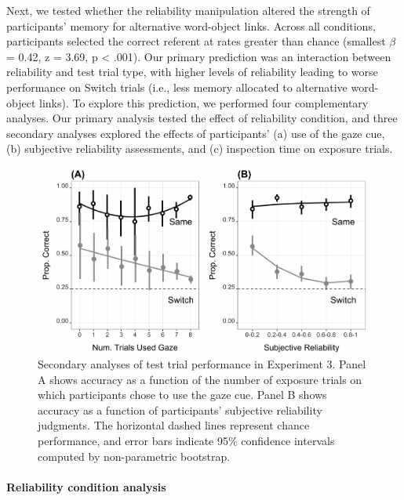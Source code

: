 \documentclass[authoryear, review]{elsarticle}
\newenvironment{CodeChunk}{}{}
\begin{document}
Next, we tested whether the reliability manipulation altered the
strength of participants' memory for alternative word-object links.
Across all conditions, participants selected the correct referent at
rates greater than chance (smallest \(\beta\) = 0.42, z = 3.69, p
\textless{} .001). Our primary prediction was an interaction between
reliability and test trial type, with higher levels of reliability
leading to worse performance on Switch trials (i.e., less memory
allocated to alternative word-object links). To explore this prediction,
we performed four complementary analyses. Our primary analysis tested
the effect of reliability condition, and three secondary analyses
explored the effects of participants' (a) use of the gaze cue, (b)
subjective reliability assessments, and (c) inspection time on exposure
trials.

\begin{CodeChunk}
\begin{figure}[tb]

{\centering \includegraphics[width=0.9\linewidth]{figs/expt3-sub-plots-1} 

}

\caption[Secondary analyses of test trial performance in Experiment 3]{Secondary analyses of test trial performance in Experiment 3. Panel A shows accuracy as a function of the number of exposure trials on which participants chose to use the gaze cue. Panel B shows accuracy as a function of participants' subjective reliability judgments. The horizontal dashed lines represent chance performance, and error bars indicate 95\% confidence intervals computed by non-parametric bootstrap.}\label{fig:expt3-sub-plots}
\end{figure}
\end{CodeChunk}

\paragraph{Reliability condition
analysis}\label{reliability-condition-analysis}
\end{document}
